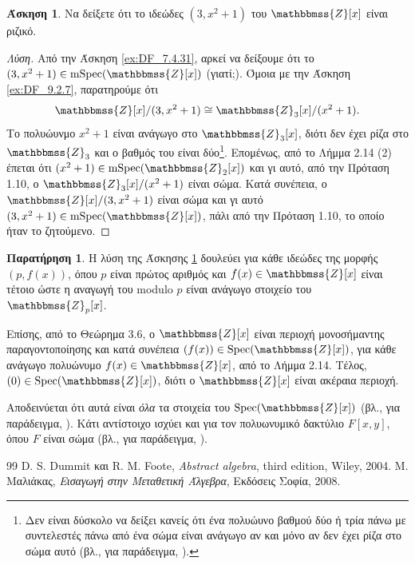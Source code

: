 \documentclass[12pt,a4paper,reqno]{amsart}
\theoremstyle{definition}
\newtheorem{exercise}{Άσκηση}
\newtheorem*{remark}{Παρατήρηση}
\newcommand{\ZZ}{\mathbbmss{Z}}
\newcommand{\Spec}{\mathrm{Spec}}
\newcommand{\mSpec}{\mathrm{mSpec}}
\begin{document}
\begin{exercise}
  \label{ex:prime_ideal_of_Z[x]}
  Να δείξετε ότι το ιδεώδες $(3, x^2+1)$ του $\ZZ[x]$ είναι ριζικό.
\end{exercise}

\begin{proof}[Λύση]
  Από την Άσκηση \ref{ex:DF_7.4.31}, αρκεί να δείξουμε ότι το $(3, x^2+1) \in \mSpec(\ZZ[x])$ (γιατί;). Όμοια με την Άσκηση \ref{ex:DF_9.2.7}, παρατηρούμε ότι 
  \[
  \ZZ[x]/(3,x^2+1) \cong \ZZ_3[x]/(x^2+1).
  \]
  Το πολυώυνμο $x^2+1$ είναι ανάγωγο στο $\ZZ_3[x]$, διότι δεν έχει ρίζα στο $\ZZ_3$ και ο βαθμός του είναι δύο\footnote{Δεν είναι δύσκολο να δείξει κανείς ότι ένα πολυώυνο βαθμού δύο ή τρία πάνω με συντελεστές πάνω από ένα σώμα είναι ανάγωγο αν και μόνο αν δεν έχει ρίζα στο σώμα αυτό (βλ., για παράδειγμα, \cite[Πρόταση 9.4.9]{DF04}).}. Επομένως, από το Λήμμα 2.14 (2) έπεται ότι $(x^2+1) \in \mSpec(\ZZ_2[x])$ και γι αυτό, από την Πρόταση 1.10, ο $\ZZ_3[x]/(x^2+1)$ είναι σώμα. Κατά συνέπεια, ο $\ZZ[x]/(3,x^2+1)$ είναι σώμα και γι αυτό $(3, x^2+1) \in \mSpec(\ZZ[x])$, πάλι από την Πρόταση 1.10, το οποίο ήταν το ζητούμενο.
\end{proof}

\begin{remark}
  Η λύση της Άσκησης \ref{ex:prime_ideal_of_Z[x]} δουλεύει για κάθε ιδεώδες της μορφής $(p, f(x))$, όπου $p$ είναι πρώτος αριθμός και $f(x) \in \ZZ[x]$ είναι τέτοιο ώστε η αναγωγή του modulo $p$ είναι ανάγωγο στοιχείο του $\ZZ_p[x]$. 

  Επίσης, από το Θεώρημα 3.6, ο $\ZZ[x]$ είναι περιοχή μονοσήμαντης παραγοντοποίησης και κατά συνέπεια $(f(x)) \in \Spec(\ZZ[x])$, για κάθε ανάγωγο πολυώνυμο $f(x) \in \ZZ[x]$, από το Λήμμα 2.14. Τέλος, $(0) \in \Spec(\ZZ[x])$, διότι ο $\ZZ[x]$ είναι ακέραια περιοχή.

  Αποδεινύεται ότι αυτά είναι \emph{όλα} τα στοιχεία του $\Spec(\ZZ[x])$ (βλ., για παράδειγμα, \cite[Πρόταση 1.4.1]{Mal08}). Κάτι αντίστοιχο ισχύει και για τον πολυωνυμικό δακτύλιο $F[x,y]$, όπου $F$ είναι σώμα (βλ., για παράδειγμα, \cite[Πρόταση 1.4.2]{Mal08}).
\end{remark}

\begin{thebibliography}{99}
    D. S. Dummit και R. M. Foote, 
    \textit{Abstract algebra},
    third edition, Wiley, 2004. 
    Μ. Μαλιάκας, 
    \textit{Εισαγωγή στην Μεταθετική Άλγεβρα}, 
    Εκδόσεις Σοφία, 2008.
\end{thebibliography}
\end{document}
